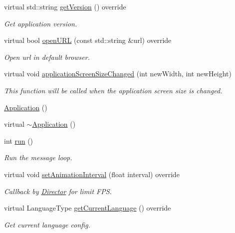 \begin{DoxyCompactItemize}
\mbox{\label{classApplication_af44096b9ba5875ef44422526b4aa7a09}} 
virtual std\+::string \hyperlink{classApplication_af44096b9ba5875ef44422526b4aa7a09}{get\+Version} () override
\begin{DoxyCompactList}\small\item\em Get application version. \end{DoxyCompactList}\item 
virtual bool \hyperlink{classApplication_a7efe73e7593e558749052d9decedf693}{open\+U\+RL} (const std\+::string \&url) override
\begin{DoxyCompactList}\small\item\em Open url in default browser. \end{DoxyCompactList}\item 
virtual void \hyperlink{classApplication_a7216832b6039483348383b8836432b17}{application\+Screen\+Size\+Changed} (int new\+Width, int new\+Height)
\begin{DoxyCompactList}\small\item\em This function will be called when the application screen size is changed. \end{DoxyCompactList}\item 
\hyperlink{classApplication_afa8cc05ce6b6092be5ecdfdae44e05f8}{Application} ()
\item 
virtual \hyperlink{classApplication_a20573928a0d53fb96d929513bc5acde6}{$\sim$\+Application} ()
\item 
\mbox{\label{classApplication_a8cf8941c8db90117d3735bce5ae1fdf4}} 
int \hyperlink{classApplication_a8cf8941c8db90117d3735bce5ae1fdf4}{run} ()
\begin{DoxyCompactList}\small\item\em Run the message loop. \end{DoxyCompactList}\item 
virtual void \hyperlink{classApplication_af04c472d3fac0d922d088896504925ac}{set\+Animation\+Interval} (float interval) override
\begin{DoxyCompactList}\small\item\em Callback by \hyperlink{classDirector}{Director} for limit F\+PS. \end{DoxyCompactList}\item 
virtual Language\+Type \hyperlink{classApplication_ac972f15de44614b03604fb4e3e05cab3}{get\+Current\+Language} () override
\begin{DoxyCompactList}\small\item\em Get current language config. \end{DoxyCompactList}\item 

\end{DoxyCompactItemize}

